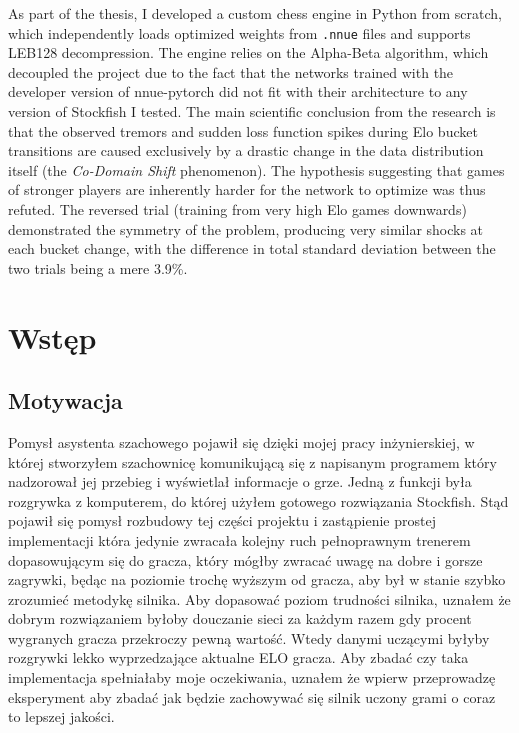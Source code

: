 \documentclass[12pt,a4paper]{report}
\begin{document}
As part of the thesis, I developed a custom chess engine in Python from scratch, which independently loads optimized weights from \texttt{.nnue} files and supports LEB128 decompression. The engine relies on the Alpha-Beta algorithm, which decoupled the project due to the fact that the networks trained with the developer version of nnue-pytorch did not fit with their architecture to any version of Stockfish I tested. The main scientific conclusion from the research is that the observed tremors and sudden loss function spikes during Elo bucket transitions are caused exclusively by a drastic change in the data distribution itself (the \textit{Co-Domain Shift} phenomenon). The hypothesis suggesting that games of stronger players are inherently harder for the network to optimize was thus refuted. The reversed trial (training from very high Elo games downwards) demonstrated the symmetry of the problem, producing very similar shocks at each bucket change, with the difference in total standard deviation between the two trials being a mere 3.9\%.

\chapter{Wstęp}

\section{Motywacja}

Pomysł asystenta szachowego pojawił się dzięki mojej pracy inżynierskiej, w której stworzyłem szachownicę komunikującą się z napisanym programem który nadzorował jej przebieg i wyświetlał informacje o grze. Jedną z funkcji była rozgrywka z komputerem, do której użyłem gotowego rozwiązania Stockfish. Stąd pojawił się pomysł rozbudowy tej części projektu i zastąpienie prostej implementacji która jedynie zwracała kolejny ruch pełnoprawnym trenerem dopasowującym się do gracza, który mógłby zwracać uwagę na dobre i gorsze zagrywki, będąc na poziomie trochę wyższym od gracza, aby był w stanie szybko zrozumieć metodykę silnika. Aby dopasować poziom trudności silnika, uznałem że dobrym rozwiązaniem byłoby douczanie sieci za każdym razem gdy procent wygranych gracza przekroczy pewną wartość. Wtedy danymi uczącymi byłyby rozgrywki lekko wyprzedzające aktualne ELO gracza. Aby zbadać czy taka implementacja spełniałaby moje oczekiwania, uznałem że wpierw przeprowadzę eksperyment aby zbadać jak będzie zachowywać się silnik uczony grami o coraz to lepszej jakości.
\end{document}
